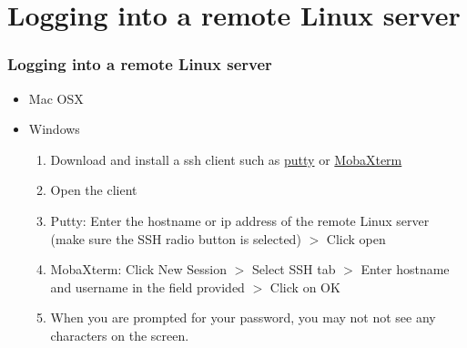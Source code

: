 \documentclass[10pt,t]{beamer}
\newcommand{\Verblubrown}[1]{\Verb[formatcom=\color{lubrown},fontseries=b,commandchars=\\\{\}]|#1|}
\begin{document}
\section*{Logging into a remote Linux server}
\begin{frame}[fragile]
  \frametitle{Logging into a remote Linux server}
  \begin{itemize}
    \item Mac OSX
    \item Windows
    \begin{enumerate}
      \item Download and install a ssh client such as \href{http://www.putty.org/}{putty} or \href{http://mobaxterm.mobatek.net/}{MobaXterm}
      \item Open the client
      \item Putty: Enter the hostname or ip address of the remote Linux server (make sure the SSH radio button is selected) $>$ Click open
      \item MobaXterm: Click New Session $>$ Select SSH tab $>$ Enter hostname and username in the field provided $>$ Click on OK
      \item When you are prompted for your password, you may not not see any characters on the screen.
    \end{enumerate}
  \end{itemize}
\end{frame}
\end{document}
